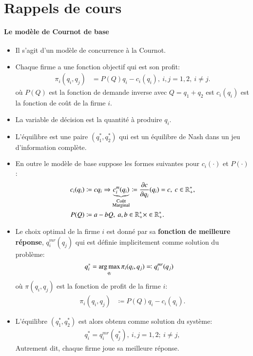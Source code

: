 \section{Rappels de cours}
\frame{\sectionpage}
\begin{frame}
[allowframebreaks]{\insertsection}
\framesubtitle{Le modèle de Cournot de base \\}
\begin{itemize}
    \item Il s'agit d'un modèle de concurrence à la Cournot. 
        \item Chaque firme a une fonction objectif qui est son profit: 
        \begin{align*}
            \pi_i(q_i, q_j) &= P(Q)q_i -c_i(q_i),  \ i, j= 1, 2, \ i\neq j.
        \end{align*}
        où $P(Q)$ est la fonction de demande inverse avec $Q = q_1 + q_2$ est $c_i(q_i)$ 
        est la fonction de coût de la firme $i$.
        \item La variable de décision est la quantité à produire $q_i$. 
        \item L'équilibre est une paire $(q_1^*, q_2^*)$ qui est un équilibre de Nash dans un jeu d'information complète.
        \item En outre le modèle de base suppose les formes suivantes pour $c_i(\cdot)$ et $P(\cdot)$:
        \begin{align*}
        c_i(q_i) &\coloneqq cq_i \Rightarrow  \underbrace{c^m_i(q_i)}_{\substack{\text{Coût}\\ \text{Marginal}}} \coloneqq\frac{\partial c}{\partial q_i}(q_i) = c, \ c\in\R_{+}^*, \\
        P(Q) &\coloneqq a - bQ, \ a, b  \in\R_{+}^*\times \in\R_{+}^*.
        \end{align*}
        
        \item  Le choix optimal de la firme $i$ est donné par sa \textbf{fonction de meilleure réponse}, $q_i^{mr}(q_j)$  qui est définie implicitement comme solution du problème:
        \begin{align*}
        q_i^* &= \argmax_{q_i}\pi_i(q_i, q_j) \eqqcolon q_i^{mr}(q_j) 
        \end{align*}
        où $\pi(q_i, q_j)$ est la fonction de profit de la firme $i$:
        \begin{align*}
        \pi_i(q_i, q_j) &\coloneqq P(Q) q_i - c_i(q_i).
        \end{align*}
        \item  L'équilibre  $(q_1^*, q_2^*)$ est alors obtenu comme solution du système:
       \begin{align*}
       q_i^* =  q_i^{mr}(q_j^*),  \ i, j = 1, 2; \ i\neq j,
       \end{align*}
       Autrement dit, chaque firme joue sa meilleure réponse.
        

\end{itemize}
\end{frame}
